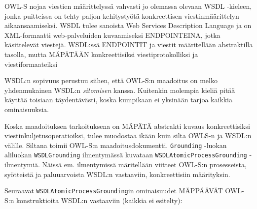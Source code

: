 \documentclass[finnish]{tktltiki2}
\theoremstyle{definition}
\theoremstyle{remark}
\begin{document}
OWL-S nojaa viestien määrittelyssä vahvasti jo olemassa olevaan WSDL -kieleen, jonka puitteissa on tehty paljon kehitystyötä konkreettisen viestinmäärittelyn aikaansaamiseksi. WSDL tulee sanoista Web Services Description Language ja on XML-formaatti web-palveluiden kuvaamiseksi ENDPOINTEINA, jotka käsittelevät viestejä. WSDL:ssä ENDPOINTIT ja viestit määritellään abstraktilla tasolla, mutta MÄPÄTÄÄN konkreettisiksi viestiprotokolliksi ja viestiformaateiksi \cite{WSDL}    

WSDL:n sopivuus perustuu siihen, että OWL-S:n maadoitus on melko yhdenmukainen WSDL:n \textit{sitomisen} kanssa\cite{OWLS}. Kuitenkin molempia kieliä pitää käyttää toisiaan täydentävästi, koska kumpikaan ei yksinään tarjoa kaikkia ominaisuuksia. 


Koska maadoituksen tarkoituksena on MÄPÄTÄ abstrakti kuvaus konkreettisiksi viestinkuljetusoperatioiksi, tulee muodostaa ikään kuin silta OWLS-n ja WSDL:n välille. Siltana toimii OWL-S:n maadoitusdokumentti. \texttt{Grounding} -luokan aliluokan \texttt{WSDLGrounding} ilmentymässä kuvataan \texttt{WSDLAtomicProcessGrounding} -ilmentymiä. Näissä em. ilmentymissä märitellään viitteet OWL-S:n  prosesseista, syötteistä ja paluuarvoista WSDL:n vastaaviin, konkreettisiin määrityksin. 

Seuraavat \texttt{WSDLAtomicProcessGrounding}in ominaisuudet MÄPPÄÄVÄT OWL-S:n konstruktioita WSDL:n vastaaviin (kaikkia ei esitelty):
\end{document}

